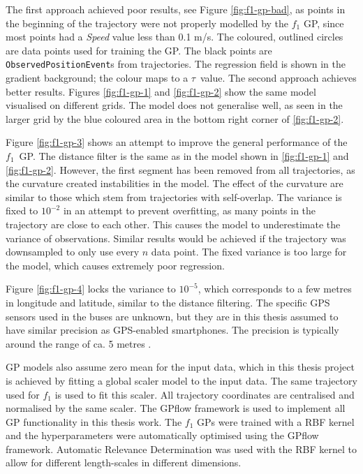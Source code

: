 The first approach achieved poor results, see Figure \ref{fig:f1-gp-bad}, as points in the beginning of the trajectory were not properly modelled by the $f_1$ GP, since most points had a \textit{Speed} value less than 0.1 m/s.
The coloured, outlined circles are data points used for training the GP.
The black points are \texttt{ObservedPositionEvent}s from trajectories.
The regression field is shown in the gradient background; the colour maps to a $\tau$ value.
The second approach achieves better results.
Figures \ref{fig:f1-gp-1} and \ref{fig:f1-gp-2} show the same model visualised on different grids.
The model does not generalise well, as seen in the larger grid by the blue coloured area in the bottom right corner of \ref{fig:f1-gp-2}.

Figure \ref{fig:f1-gp-3} shows an attempt to improve the general performance of the $f_1$ GP.
The distance filter is the same as in the model shown in \ref{fig:f1-gp-1} and \ref{fig:f1-gp-2}.
However, the first segment has been removed from all trajectories, as the curvature created instabilities in the model.
The effect of the curvature are similar to those which stem from trajectories with self-overlap.
The variance is fixed to $10^{-2}$ in an attempt to prevent overfitting, as many points in the trajectory are close to each other.
This causes the model to underestimate the variance of observations.
Similar results would be achieved if the trajectory was downsampled to only use every $n$ data point.
The fixed variance is too large for the model, which causes extremely poor regression.

Figure \ref{fig:f1-gp-4} locks the variance to $10^{-5}$, which corresponds to a few metres in longitude and latitude, similar to the distance filtering.
The specific GPS sensors used in the buses are unknown, but they are in this thesis assumed to have similar precision as GPS-enabled smartphones.
The precision is typically around the range of ca. 5 metres \cite{van2015}.

GP models also assume zero mean for the input data, which in this thesis project is achieved by fitting a global scaler model to the input data.
The same trajectory used for $f_1$ is used to fit this scaler.
All trajectory coordinates are centralised and normalised by the same scaler.
The GPflow framework \cite{GPflow2017} is used to implement all GP functionality in this thesis work. 
The $f_1$ GPs were trained with a RBF kernel and the hyperparameters were automatically optimised using the GPflow framework.
Automatic Relevance Determination \cite{Rasmussen2006} was used with the RBF kernel to allow for different length-scales in different dimensions.


